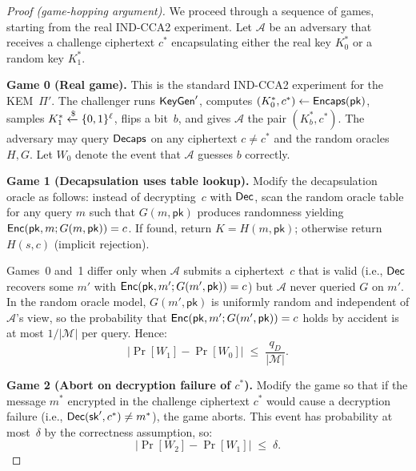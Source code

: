 \begin{proof}[Proof (game-hopping argument)]
We proceed through a sequence of games, starting from the real
IND-CCA2 experiment.  Let $\mathcal{A}$ be an adversary that
receives a challenge ciphertext $c^*$ encapsulating either the
real key $K_0^*$ or a random key $K_1^*$.

\medskip\noindent\textbf{Game 0 (Real game).}
This is the standard IND-CCA2 experiment for the KEM~$\Pi'$.
The challenger runs $\mathsf{KeyGen}'$, computes
$(K_0^*, c^*) \leftarrow \mathsf{Encaps}(\mathsf{pk})$, samples
$K_1^* \getsr \{0,1\}^\ell$, flips a bit~$b$, and gives
$\mathcal{A}$ the pair $(K_b^*, c^*)$.  The adversary may
query $\mathsf{Decaps}$ on any ciphertext $c \neq c^*$ and the random
oracles $H, G$.  Let $W_0$ denote the event that $\mathcal{A}$
guesses $b$ correctly.

\medskip\noindent\textbf{Game 1 (Decapsulation uses table
lookup).}
Modify the decapsulation oracle as follows: instead of
decrypting~$c$ with $\mathsf{Dec}$, scan the random oracle table for
any query $m$ such that $G(m, \mathsf{pk})$ produces
randomness yielding $\mathsf{Enc}(\mathsf{pk}, m; G(m, \mathsf{pk}))
= c$.  If found, return $K = H(m, \mathsf{pk})$; otherwise
return $H(s, c)$ (implicit rejection).

Games~0 and~1 differ only when $\mathcal{A}$ submits a
ciphertext~$c$ that is valid (i.e., $\mathsf{Dec}$ recovers some $m'$
with $\mathsf{Enc}(\mathsf{pk}, m'; G(m',\mathsf{pk})) = c$) but
$\mathcal{A}$ never queried $G$ on $m'$.  In the random oracle
model, $G(m', \mathsf{pk})$ is uniformly random and
independent of $\mathcal{A}$'s view, so the probability that
$\mathsf{Enc}(\mathsf{pk}, m'; G(m', \mathsf{pk})) = c$ holds by
accident is at most $1/|\mathcal{M}|$ per query.  Hence:
\begin{equation}
|\Pr[W_1] - \Pr[W_0]| \;\leq\; \frac{q_D}{|\mathcal{M}|}.
\end{equation}

\medskip\noindent\textbf{Game 2 (Abort on decryption failure
of $c^*$).}
Modify the game so that if the message $m^*$ encrypted in the
challenge ciphertext $c^*$ would cause a decryption failure
(i.e., $\mathsf{Dec}(\mathsf{sk}', c^*) \neq m^*$), the game aborts.
This event has probability at most~$\delta$ by the correctness
assumption, so:
\begin{equation}
|\Pr[W_2] - \Pr[W_1]| \;\leq\; \delta.
\end{equation}


\end{proof}
